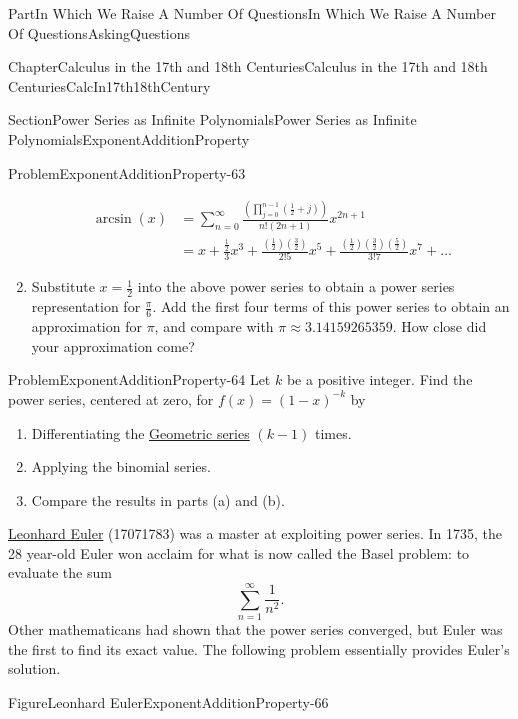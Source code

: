 \documentclass[oneside,10pt,]{book}
\numberwithin{equation}{part}
\newcommand{\amp}{&}
\begin{document}
\begin{partptx}{Part}{In Which We Raise A Number Of Questions}{}{In Which We Raise A Number Of Questions}{}{}{AskingQuestions}
\begin{chapterptx}{Chapter}{Calculus in the 17th and 18th Centuries}{}{Calculus in the 17th and 18th Centuries}{}{}{CalcIn17th18thCentury}
\begin{sectionptx}{Section}{Power Series as Infinite Polynomials}{}{Power Series as Infinite Polynomials}{}{}{ExponentAdditionProperty}
\begin{problem}{Problem}{}{ExponentAdditionProperty-63}
\begin{enumerate}[font=\bfseries,label=(\alph*),ref=\alph*]
\begin{align*}
\arcsin \left(x\right)\amp{}=\sum^{\infty
}_{n=0}{\frac{\left(\prod^{n-1}_{j=0}{\left(\frac{1}{2}+j\right)}\right)}{n!\left(2n+1\right)}x^{2n+1}}\\
\amp{}=x+\frac{\frac{1}{2}}{3}x^3+\frac{\left(\frac{1}{2}\right)\left(\frac{3}{2}\right)}{2!5}x^5+\frac{\left(\frac{1}{2}\right)\left(\frac{3}{2}\right)\left(\frac{5}{2}\right)}{3!7}x^7+\dots 
\end{align*}
%
\item{}Substitute \(x=\frac{1}{2}\) into the above power series to obtain a power series representation for \(\frac{\pi
}{6}\).  Add the first four terms of this power series to obtain an approximation for \(\pi \), and compare with \(\pi
\approx 3.14159265359\).  How close did your approximation come?%
\end{enumerate}%
\end{problem}
\begin{problem}{Problem}{}{ExponentAdditionProperty-64}%
Let \(k\) be a positive integer.  Find the power series, centered at zero, for \(f(x) =
\left(1-x\right)^{-k}\) by%
\begin{enumerate}[font=\bfseries,label=(\alph*),ref=\alph*]%
\item{}Differentiating the \hyperref[EQUATIONGeometricSeries]{Geometric series} \(\left(k-1\right)\) times.%
\item{}Applying the binomial series.%
\item{}Compare the results in parts (a) and (b).%
\end{enumerate}%
\end{problem}
\href{https://mathshistory.st-andrews.ac.uk/Biographies/Euler/}{Leonhard Euler} (1707\textendash{}1783) was a master at exploiting power series.  In 1735, the 28 year-old Euler won acclaim for what is now called the Basel problem: to evaluate the sum%
\begin{equation*}
\sum_{n=1}^\infty\frac{1}{n^2}\text{.}
\end{equation*}
Other mathematicans had shown that the power series converged, but Euler was the first to find its exact value.  The following problem essentially provides Euler's solution.%
\begin{figureptx}{Figure}{Leonhard Euler}{ExponentAdditionProperty-66}{}%
%
%
\begin{image}{0.325}{0.35}{0.325}{}%

\end{image}
\end{figureptx}
\end{sectionptx}
\end{chapterptx}
\end{partptx}
\end{document}
